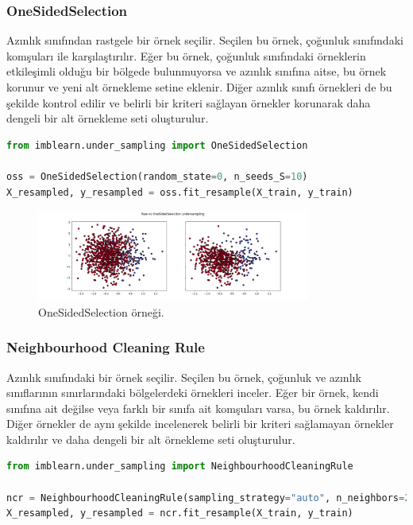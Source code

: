 \subsubsection{OneSidedSelection}
Azınlık sınıfından rastgele bir örnek seçilir. Seçilen bu örnek, çoğunluk sınıfındaki komşuları ile karşılaştırılır. Eğer bu örnek, çoğunluk sınıfındaki örneklerin etkileşimli olduğu bir bölgede bulunmuyorsa ve azınlık sınıfına aitse, bu örnek korunur ve yeni alt örnekleme setine eklenir. Diğer azınlık sınıfı örnekleri de bu şekilde kontrol edilir ve belirli bir kriteri sağlayan örnekler korunarak daha dengeli bir alt örnekleme seti oluşturulur.

\begin{lstlisting}[language=Python]
from imblearn.under_sampling import OneSidedSelection

oss = OneSidedSelection(random_state=0, n_seeds_S=10)
X_resampled, y_resampled = oss.fit_resample(X_train, y_train)
\end{lstlisting}

\begin{figure}[h]
    \centering
    \includegraphics[width=0.8\textwidth]{images/Raw vs OneSidedSelection undersampling.png}
    \caption{OneSidedSelection örneği.}
    \label{fig:enter-label}
\end{figure}

\subsubsection{Neighbourhood Cleaning Rule}
Azınlık sınıfındaki bir örnek seçilir. Seçilen bu örnek, çoğunluk ve azınlık sınıflarının sınırlarındaki bölgelerdeki örnekleri inceler. Eğer bir örnek, kendi sınıfına ait değilse veya farklı bir sınıfa ait komşuları varsa, bu örnek kaldırılır. Diğer örnekler de aynı şekilde incelenerek belirli bir kriteri sağlamayan örnekler kaldırılır ve daha dengeli bir alt örnekleme seti oluşturulur.

\begin{lstlisting}[language=Python]
from imblearn.under_sampling import NeighbourhoodCleaningRule

ncr = NeighbourhoodCleaningRule(sampling_strategy="auto", n_neighbors=250, threshold_cleaning=0.5)
X_resampled, y_resampled = ncr.fit_resample(X_train, y_train)
\end{lstlisting}


